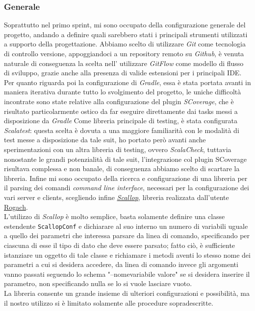 \subsubsection{\textbf{Generale}}
Soprattutto nel primo sprint, mi sono occupato della configurazione generale del progetto, andando a definire quali sarebbero stati i principali strumenti utilizzati a supporto della progettazione.
Abbiamo scelto di utilizzare \textit{Git} come tecnologia di controllo versione, appoggiandoci a un repository remoto su \textit{Github}, è venuta naturale di conseguenza la scelta nell' utilizzare \textit{GitFlow} come modello di flusso di sviluppo, grazie anche alla presenza di valide estensioni per i principali IDE.
Per quanto riguarda poi la configurazione di \textit{Gradle}, essa è stata portata avanti in maniera iterativa durante tutto lo svolgimento del progetto, le uniche difficoltà incontrate sono state relative alla configurazione del plugin \textit{SCoverage}, che è risultato particolarmente ostico da far eseguire direttamente dai tasks messi a disposizione da \textit{Gradle}
Come libreria principale di testing, è stata configurata \textit{Scalatest}: questa scelta è dovuta a una maggiore familiarità con le modalità di test messe a disposizione da tale suit, ho portato però avanti anche sperimentazioni con un altra libreria di testing, ovvero \textit{ScalaCheck}, tuttavia nonostante le grandi potenzialità di tale suit, l'integrazione col plugin SCoverage risultava complessa e non banale, di conseguenza abbiamo scelto di scartare la libreria.
Infine mi sono occupato della ricerca e configurazione di una libreria per il parsing dei comandi \textit{command line interface}, necessari per la configurazione dei vari server e clients, scegliendo infine \href{https://github.com/scallop/scallop}{\textit{Scallop}}, libreria realizzata dall'utente \href{https://github.com/Rogach}{Rogach}.\\
L'utilizzo di \textit{Scallop} è molto semplice, basta solamente definire una classe estendente \texttt{ScallopConf} e dichiarare al suo interno un numero di variabili uguale a quello dei parametri che interessa parsare da linea di comando, specificando per ciascuna di esse il tipo di dato che deve essere parsato; fatto ciò, è sufficiente istanziare un oggetto di tale classe e richiamare i metodi aventi lo stesso nome dei parametri a cui si desidera accedere, da linea di comando invece gli argomenti vanno passati seguendo lo schema "--nomevariabile valore" se si desidera inserire il parametro, non specificando nulla se lo si vuole lasciare vuoto.\\
La libreria consente un grande insieme di ulteriori configurazioni e possibilità, ma il nostro utilizzo si è limitato solamente alle procedure sopradescritte.

